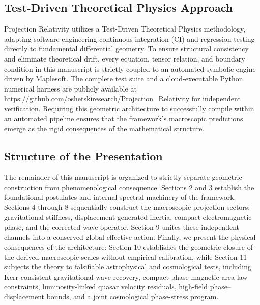 \documentclass[11pt]{article}
\begin{document}
\subsection{Test-Driven Theoretical Physics Approach}
Projection Relativity utilizes a Test-Driven Theoretical Physics methodology, adapting software engineering continuous integration (CI) and regression testing directly to fundamental differential geometry. To ensure structural consistency and eliminate theoretical drift, every equation, tensor relation, and boundary condition in this manuscript is strictly coupled to an automated symbolic engine driven by Maplesoft. The complete test suite and a cloud-executable Python numerical harness are publicly available at \url{https://github.com/oshetskiresearch/Projection_Relativity} for independent verification. Requiring this geometric architecture to successfully compile within an automated pipeline ensures that the framework's macroscopic predictions emerge as the rigid consequences of the mathematical structure.

\subsection{Structure of the Presentation} The remainder of this manuscript is organized to strictly separate geometric construction from phenomenological consequence. Sections 2 and 3 establish the foundational postulates and internal spectral machinery of the framework. Sections 4 through 8 sequentially construct the macroscopic projection sectors: gravitational stiffness, displacement-generated inertia, compact electromagnetic phase, and the corrected wave operator. Section 9 unites these independent channels into a conserved global effective action. Finally, we present the physical consequences of the architecture: Section 10 establishes the geometric closure of the derived macroscopic scales without empirical calibration, while Section 11 subjects the theory to falsifiable astrophysical and cosmological tests, including Kerr-consistent gravitational-wave recovery, compact-phase magnetic area-law constraints, luminosity-linked quasar velocity residuals, high-field phase--displacement bounds, and a joint cosmological phase-stress program.
\end{document}
